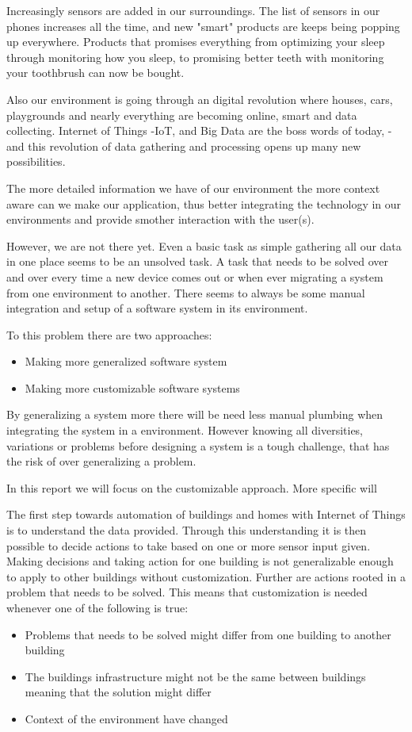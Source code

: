 Increasingly sensors are added in our surroundings. 
The list of sensors in our phones increases all the time, and new "smart" products are keeps being popping up everywhere.
Products that promises everything from optimizing your sleep through monitoring how you sleep\cite{wareable}, to promising better teeth with monitoring your toothbrush\cite{toothbrush} can now be bought.

Also our environment is going through an digital revolution where houses, cars, playgrounds and nearly everything are becoming online, smart and data collecting.
Internet of Things -IoT, and Big Data are the boss words of today, -and this revolution of data gathering and processing opens up many new possibilities.

The more detailed information we have of our environment the more context aware can we make our application, thus better integrating the technology in our environments and provide smother interaction with the user(s).

However, we are not there yet. 
Even a basic task as simple gathering all our data in one place seems to be an unsolved task.
A task that needs to be solved over and over every time a new device comes out or when ever migrating a system from one environment to another. 
There seems to always be some manual integration and setup of a software system in its environment.

To this problem there are two approaches:
\begin{itemize}
\item Making more generalized software system
\item Making more customizable software systems
\end{itemize}

By generalizing a system more there will be need less manual plumbing when integrating the system in a environment. 
However knowing all diversities, variations or problems before designing a system is a tough challenge, that has the risk of over generalizing a problem.

In this report we will focus on the customizable approach.
More specific will 

The first step towards automation of buildings and homes with Internet of Things is to understand the data provided. 
Through this understanding it is then possible to decide actions to take based on one or more sensor input given. 
Making decisions and taking action for one building is not generalizable enough to apply to other buildings without customization. 
Further are actions rooted in a problem that needs to be solved. 
This means that customization is needed whenever one of the following is true:
\begin{itemize}
\item Problems that needs to be solved might differ from one building to another building
\item The buildings infrastructure might not be the same between buildings meaning that the solution might differ
\item Context of the environment have changed
\end{itemize}

